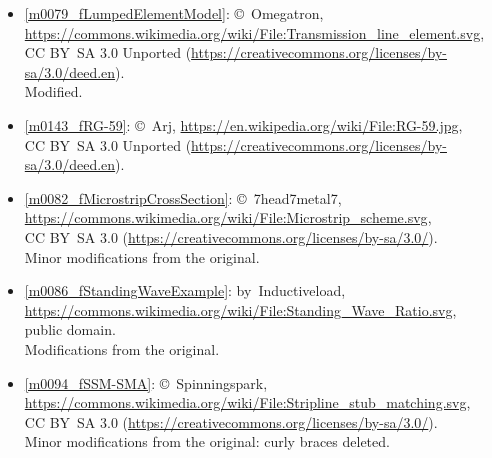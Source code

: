 \begin{itemize}
\item[Fig.] \label{m0079_fLumpedElementModel_Credit}
  \ref{m0079_fLumpedElementModel}:
  \copyright~Omegatron, 
  \url{https://commons.wikimedia.org/wiki/File:Transmission_line_element.svg},\\ 
  CC BY~SA 3.0 Unported (\url{https://creativecommons.org/licenses/by-sa/3.0/deed.en}).\\
  Modified.

\item[Fig.] \label{m0143_fRG-59_Credit}
  \ref{m0143_fRG-59}:
  \copyright~Arj, 
  \url{https://en.wikipedia.org/wiki/File:RG-59.jpg},\\ 
  CC BY~SA 3.0 Unported (\url{https://creativecommons.org/licenses/by-sa/3.0/deed.en}).

\item[Fig.] \label{m0082_fMicrostripCrossSection_Credit}
  \ref{m0082_fMicrostripCrossSection}:
  \copyright~7head7metal7, 
  \url{https://commons.wikimedia.org/wiki/File:Microstrip_scheme.svg},\\ 
  CC BY~SA 3.0 (\url{https://creativecommons.org/licenses/by-sa/3.0/}).\\
  Minor modifications from the original.

\item[Fig.] \label{m0086_fStandingWaveExample_Credit}
  \ref{m0086_fStandingWaveExample}:
  by~Inductiveload, 
  \url{https://commons.wikimedia.org/wiki/File:Standing_Wave_Ratio.svg},\\ 
  public domain.\\
  Modifications from the original.

\item[Fig.] \label{m0094_fSSM-SMA_Credit}
  \ref{m0094_fSSM-SMA}:
  \copyright~Spinningspark, 
  \url{https://commons.wikimedia.org/wiki/File:Stripline_stub_matching.svg},\\ 
  CC BY~SA 3.0 (\url{https://creativecommons.org/licenses/by-sa/3.0/}).\\
  Minor modifications from the original: curly braces deleted.

\end{itemize}

\twocolumn
